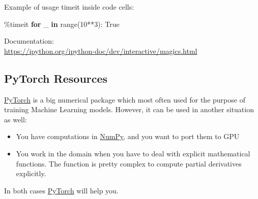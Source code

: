 \documentclass[
]{article}
\newenvironment{Shaded}{}{}
\newcommand{\BuiltInTok}[1]{#1}
\newcommand{\ControlFlowTok}[1]{\textcolor[rgb]{0.00,0.44,0.13}{\textbf{#1}}}
\newcommand{\DecValTok}[1]{\textcolor[rgb]{0.25,0.63,0.44}{#1}}
\newcommand{\KeywordTok}[1]{\textcolor[rgb]{0.00,0.44,0.13}{\textbf{#1}}}
\newcommand{\NormalTok}[1]{#1}
\newcommand{\OperatorTok}[1]{\textcolor[rgb]{0.40,0.40,0.40}{#1}}
\newcommand{\VariableTok}[1]{\textcolor[rgb]{0.10,0.09,0.49}{#1}}
\begin{document}
Example of usage timeit inside code cells:

\begin{Shaded}
\begin{Highlighting}[]
\OperatorTok{\%}\NormalTok{timeit }\ControlFlowTok{for}\NormalTok{ \_ }\KeywordTok{in} \BuiltInTok{range}\NormalTok{(}\DecValTok{10}\OperatorTok{**}\DecValTok{3}\NormalTok{): }\VariableTok{True}
\end{Highlighting}
\end{Shaded}

Documentation: \\
\url{https://ipython.org/ipython-doc/dev/interactive/magics.html}

\hypertarget{pytorch-resources}{%
\subsection{PyTorch Resources}\label{pytorch-resources}}

\href{https://pytorch.org/}{PyTorch} is a big numerical package which
most often used for the purpose of training Machine Learning models.
However, it can be used in another situation as well:

\begin{itemize}
\item
  You have computations in \href{https://numpy.org/}{NumPy}, and you
  want to port them to GPU
\item
  You work in the domain when you have to deal with explicit
  mathematical functions. The function is pretty complex to compute
  partial derivatives explicitly.
\end{itemize}

In both cases \href{https://pytorch.org/}{PyTorch} will help you.
\end{document}
